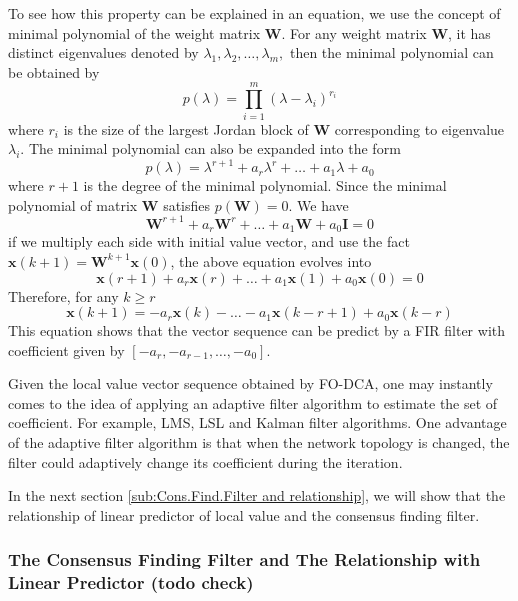 To see how this property can be explained in an equation, we use the
concept of minimal polynomial of the weight matrix $\mathbf{W}$.
For any weight matrix $\mathbf{W}$, it has distinct eigenvalues denoted
by $\lambda_{1},\lambda_{2},\ldots,\lambda_{m},$ then the minimal
polynomial can be obtained by 
\[
p(\lambda)=\prod_{i=1}^{m}\left(\lambda-\lambda_{i}\right)^{r_{i}}
\]
where $r_{i}$ is the size of the largest Jordan block of $\mathbf{W}$
corresponding to eigenvalue $\lambda_{i}$. The minimal polynomial
can also be expanded into the form 
\[
p\left(\lambda\right)=\lambda^{r+1}+a_{r}\lambda^{r}+\ldots+a_{1}\lambda+a_{0}
\]
where $r+1$ is the degree of the minimal polynomial. Since the minimal
polynomial of matrix $\mathbf{W}$ satisfies $p\left(\mathbf{W}\right)=0$.
We have
\[
\mathbf{W}^{r+1}+a_{r}\mathbf{W}^{r}+\ldots+a_{1}\mathbf{W}+a_{0}\mathbf{I}=0
\]
if we multiply each side with initial value vector, and use the fact
$\mathbf{x}\left(k+1\right)=\mathbf{W}^{k+1}\mathbf{x}\left(0\right)$,
the above equation evolves into
\begin{equation}
\mathbf{x}\left(r+1\right)+a_{r}\mathbf{x}\left(r\right)+\ldots+a_{1}\mathbf{x}\left(1\right)+a_{0}\mathbf{x}\left(0\right)=0\label{eq:local value linear combination}
\end{equation}
Therefore, for any $k\geq r$
\begin{equation}
\mathbf{x}\left(k+1\right)=-a_{r}\mathbf{x}\left(k\right)-\ldots-a_{1}\mathbf{x}\left(k-r+1\right)+a_{0}\mathbf{x}\left(k-r\right)\label{eq:local value linear predictor}
\end{equation}
This equation shows that the vector sequence can be predict by a FIR
filter with coefficient given by $\left[-a_{r},-a_{r-1},\ldots,-a_{0}\right].$

Given the local value vector sequence obtained by FO-DCA, one may
instantly comes to the idea of applying an adaptive filter algorithm
to estimate the set of coefficient. For example, LMS, LSL and Kalman
filter algorithms. One advantage of the adaptive filter algorithm
is that when the network topology is changed, the filter could adaptively
change its coefficient during the iteration. 

In the next section \ref{sub:Cons.Find.Filter and relationship},
we will show that the relationship of linear predictor of local value
and the consensus finding filter.


\subsubsection{\label{sub:Cons.Find.Filter and relationship}The Consensus Finding
Filter and The Relationship with Linear Predictor (todo check)}

